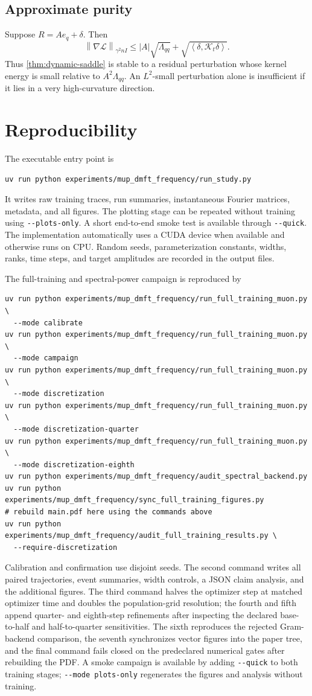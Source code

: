 \documentclass[11pt]{article}
\newcommand{\1}{\mathbf 1}
\newcommand{\ip}[2]{\left\langle #1,#2\right\rangle}
\newcommand{\norm}[1]{\left\lVert #1\right\rVert}
\newcommand{\cL}{\mathcal L}
\theoremstyle{plain}
\theoremstyle{definition}
\begin{document}
\subsection{Approximate purity}

Suppose \(R=Ae_q+\delta\).  Then
\[
 \norm{\nabla\cL}_{\gamma^2nI}
 \leq |A|\sqrt{\Lambda_{qq}}
 +\sqrt{\ip{\delta}{\mathcal K_t\delta}}.
\]
Thus \cref{thm:dynamic-saddle} is stable to a residual perturbation whose
kernel energy is small relative to \(A^2\Lambda_{qq}\).  An \(L^2\)-small
perturbation alone is insufficient if it lies in a very high-curvature
direction.

\section{Reproducibility}

The executable entry point is
\begin{verbatim}
uv run python experiments/mup_dmft_frequency/run_study.py
\end{verbatim}
It writes raw training traces, run summaries, instantaneous Fourier matrices,
metadata, and all figures.  The plotting stage can be repeated without
training using \verb|--plots-only|.  A short end-to-end smoke test is
available through \verb|--quick|.  The implementation automatically uses a
CUDA device when available and otherwise runs on CPU.  Random seeds,
parameterization constants, widths, ranks, time steps, and target amplitudes
are recorded in the output files.

The full-training and spectral-power campaign is reproduced by
\begin{verbatim}
uv run python experiments/mup_dmft_frequency/run_full_training_muon.py \
  --mode calibrate
uv run python experiments/mup_dmft_frequency/run_full_training_muon.py \
  --mode campaign
uv run python experiments/mup_dmft_frequency/run_full_training_muon.py \
  --mode discretization
uv run python experiments/mup_dmft_frequency/run_full_training_muon.py \
  --mode discretization-quarter
uv run python experiments/mup_dmft_frequency/run_full_training_muon.py \
  --mode discretization-eighth
uv run python experiments/mup_dmft_frequency/audit_spectral_backend.py
uv run python experiments/mup_dmft_frequency/sync_full_training_figures.py
# rebuild main.pdf here using the commands above
uv run python experiments/mup_dmft_frequency/audit_full_training_results.py \
  --require-discretization
\end{verbatim}
Calibration and confirmation use disjoint seeds.  The second command writes
all paired trajectories, event summaries, width controls, a JSON claim
analysis, and the additional figures. The third command halves the optimizer
step at matched optimizer time and doubles the population-grid resolution;
the fourth and fifth append quarter- and eighth-step refinements after
inspecting the declared base-to-half and half-to-quarter sensitivities.  The
sixth reproduces the rejected Gram-backend comparison, the seventh
synchronizes vector figures into the paper tree, and the final command fails
closed on the predeclared numerical gates after rebuilding the PDF. A smoke
campaign is available by adding \verb|--quick| to both training stages;
\verb|--mode plots-only| regenerates the figures and analysis without
training.
\end{document}
